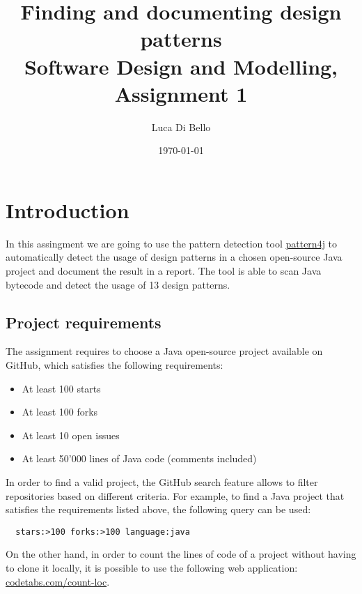 \documentclass[a4paper, 11pt]{article}
\title{Finding and documenting design patterns \\[1ex] \large Software Design and Modelling, Assignment 1}
\author{Luca Di Bello}
\date{\today}
\begin{document}
\maketitle
\tableofcontents


\section{Introduction}

In this assingment we are going to use the pattern detection tool \href{https://users.encs.concordia.ca/~nikolaos/pattern\_detection.html}{pattern4j} to automatically detect the usage of design patterns in a chosen open-source Java project and document the result in a report. The tool is able to scan Java bytecode and detect the usage of 13 design patterns.

\subsection{Project requirements}

The assignment requires to choose a Java open-source project available on GitHub, which satisfies the following requirements:

\begin{itemize}
	\item At least 100 starts
	\item At least 100 forks
	\item At least 10 open issues
	\item At least 50'000 lines of Java code (comments included)
\end{itemize}

\noindent In order to find a valid project, the GitHub search feature allows to filter repositories based on different criteria. For example, to find a Java project that satisfies the requirements listed above, the following query can be used:

\begin{verbatim}
  stars:>100 forks:>100 language:java
\end{verbatim}

\noindent On the other hand, in order to count the lines of code of a project without having to clone it locally, it is possible to use the following web application: \href{https://codetabs.com/count-loc/count-loc-online.html}{codetabs.com/count-loc}.
\end{document}
